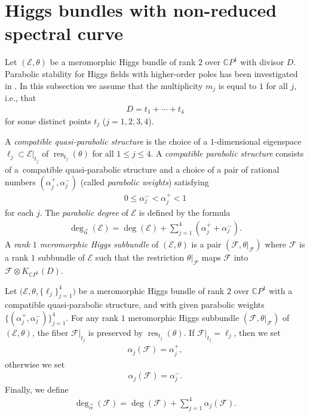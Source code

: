 \documentclass[pdftex]{sigma}
\newcommand{\CP}[1]{\mathbb{C}P^{#1}} %
\newcommand{\E}{{\mathcal E}} %
\newcommand{\F}{{\mathcal F}} %
\newcommand{\pardeg}{\deg_{\vec{\alpha}}}
\DeclareMathOperator{\res}{res}
\numberwithin{equation}{section}
\begin{document}
\section{Higgs bundles with non-reduced spectral curve}\label{s:parabolic}

Let $(\E , \theta)$ be a meromorphic Higgs bundle of rank $2$ over
$\CP1$ with divisor $D$. Parabolic stability for Higgs fields with
higher-order poles has been investigated in
\cite{ISS, ISS2}. In this subsection we assume that the multiplicity
$m_j$ is equal to $1$ for all $j$, i.e., that
\begin{gather*}
 D = t_1 + \cdots + t_4
\end{gather*}
for some distinct points $t_j$ ($j=1,2,3,4$).
\begin{defn}
 A {\it compatible quasi-parabolic structure} is the choice of a $1$-dimensional eigen\-space $\ell_j \subset \E|_{t_j}$ of $\res_{t_j} (\theta )$ for all $1 \leq j \leq 4$.
 A {\it compatible parabolic structure} consists of a~compatible quasi-parabolic structure and a choice of a pair of rational numbers $(\alpha_j^+, \alpha_j^-)$
 (called {\it parabolic weights}) satisfying
 \begin{gather*}
 0 \leq \alpha_j^- < \alpha_j^+ < 1
 \end{gather*}
 for each $j$. The {\it parabolic degree} of $\E$ is defined by the formula
 \begin{gather*}
 \pardeg (\E ) = \deg (\E ) + \sum_{j=1}^4 (\alpha_j^+ + \alpha_j^-).
 \end{gather*}
 A {\it rank $1$ meromorphic Higgs subbundle} of $(\E ,\theta )$ is a pair $(\F , \theta|_{\F})$ where $\F$ is a rank $1$ subbundle of $\E$ such that the restriction
 $\theta|_{\F}$ maps $\F$ into $\F \otimes K_{\CP1}(D)$.
 \end{defn}

Let $\big(\E , \theta, \{ \ell_j \}_{j=1}^4\big)$ be a meromorphic Higgs
 bundle of rank $2$ over $\CP1$ with a compatible quasi-parabolic
 structure, and with given parabolic weights $\{ (\alpha_j^+,
 \alpha_j^-) \}_{j=1}^4$. For any rank $1$ meromorphic Higgs
 subbundle $(\F , \theta|_{\F})$ of $(\E ,\theta )$, the fiber
 $\F|_{t_j}$ is preserved by $\res_{t_j}(\theta )$. If $\F|_{t_j} = \ell_j$, then we set
 \begin{gather*}%
 \alpha_j(\F ) = \alpha_j^+,
 \end{gather*}
 otherwise we set
 \begin{gather*}
 \alpha_j(\F ) = \alpha_j^-.
 \end{gather*}
 Finally, we define
 \begin{gather*}
 \pardeg (\F ) = \deg (\F ) + \sum_{j=1}^4 \alpha_j(\F ).
 \end{gather*}
\end{document}
